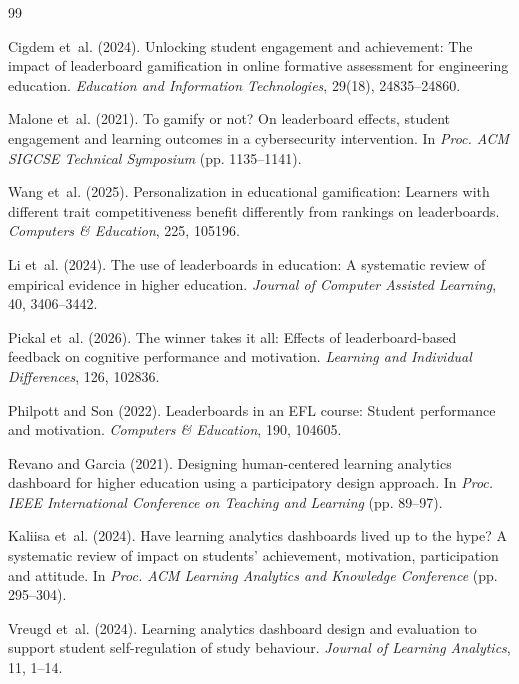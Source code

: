 \documentclass[12pt]{article}
\begin{document}
\begin{thebibliography}{99}

 Cigdem et~al. (2024). Unlocking student engagement and achievement: The impact of leaderboard gamification in online formative assessment for engineering education. \textit{Education and Information Technologies}, 29(18), 24835--24860.

 Malone et~al. (2021). To gamify or not? On leaderboard effects, student engagement and learning outcomes in a cybersecurity intervention. In \textit{Proc. ACM SIGCSE Technical Symposium} (pp. 1135--1141).

 Wang et~al. (2025). Personalization in educational gamification: Learners with different trait competitiveness benefit differently from rankings on leaderboards. \textit{Computers \& Education}, 225, 105196.

 Li et~al. (2024). The use of leaderboards in education: A systematic review of empirical evidence in higher education. \textit{Journal of Computer Assisted Learning}, 40, 3406--3442.

 Pickal et~al. (2026). The winner takes it all: Effects of leaderboard-based feedback on cognitive performance and motivation. \textit{Learning and Individual Differences}, 126, 102836.

 Philpott and Son (2022). Leaderboards in an EFL course: Student performance and motivation. \textit{Computers \& Education}, 190, 104605.

 Revano and Garcia (2021). Designing human-centered learning analytics dashboard for higher education using a participatory design approach. In \textit{Proc. IEEE International Conference on Teaching and Learning} (pp. 89--97).

 Kaliisa et~al. (2024). Have learning analytics dashboards lived up to the hype? A systematic review of impact on students' achievement, motivation, participation and attitude. In \textit{Proc. ACM Learning Analytics and Knowledge Conference} (pp. 295--304).

 Vreugd et~al. (2024). Learning analytics dashboard design and evaluation to support student self-regulation of study behaviour. \textit{Journal of Learning Analytics}, 11, 1--14.


\end{thebibliography}
\end{document}
